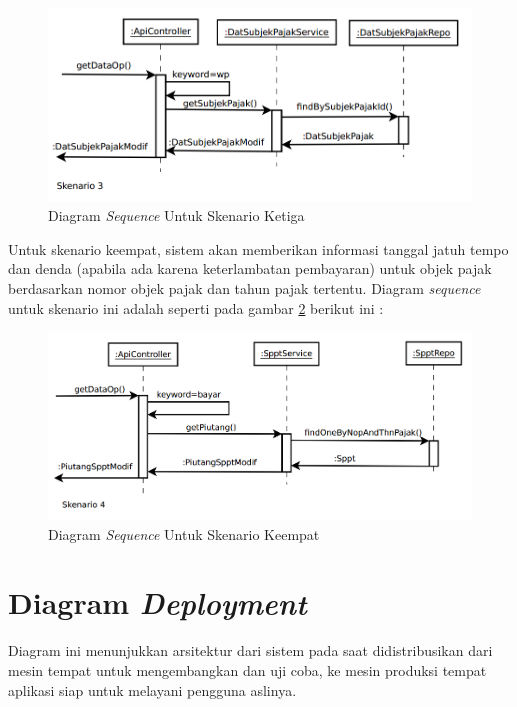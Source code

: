 \begin{figure}[H]
	\centering
	\includegraphics[width=1\textwidth]{./resources/uml/seq-dia-3}
	\caption{Diagram \textit{Sequence} Untuk Skenario Ketiga}
	\label{fig:seq-dia-be-3}
\end{figure}

Untuk skenario keempat, sistem akan memberikan informasi tanggal jatuh tempo dan denda (apabila ada karena keterlambatan pembayaran) untuk objek pajak berdasarkan nomor objek pajak dan tahun pajak tertentu. Diagram \textit{sequence} untuk skenario ini adalah seperti pada gambar \ref{fig:seq-dia-be-4} berikut ini :

\begin{figure}[H]
	\centering
	\includegraphics[width=1\textwidth]{./resources/uml/seq-dia-4}
	\caption{Diagram \textit{Sequence} Untuk Skenario Keempat}
	\label{fig:seq-dia-be-4}
\end{figure}

\section{Diagram \textit{Deployment}}

Diagram ini menunjukkan arsitektur dari sistem pada saat didistribusikan dari mesin tempat untuk mengembangkan dan uji coba, ke mesin produksi tempat aplikasi siap untuk melayani pengguna aslinya.

